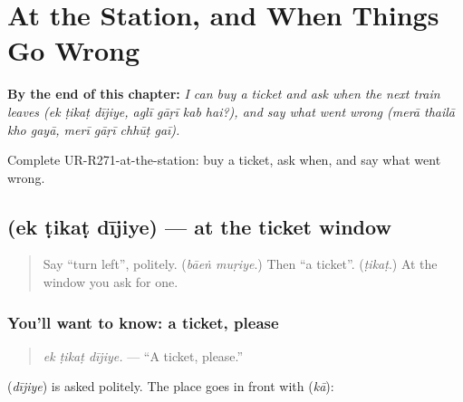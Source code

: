 
\chapter{At the Station, and When Things Go Wrong}
\label{ch:ur-at-the-station-and-when-things-go-wrong}

\begin{chapteropening}
\textbf{By the end of this chapter:} \emph{I can buy a ticket and ask when the next train leaves (ek ṭikaṭ dījiye, aglī gāṛī kab hai?), and say what went wrong (merā thailā kho gayā, merī gāṛī chhūṭ gaī).}

Complete UR-R271-at-the-station: buy a ticket, ask when, and say what went wrong.
\end{chapteropening}

\section[\texorpdfstring{\ur{ایک} \ur{ٹکٹ} \ur{دیجیے} (ek ṭikaṭ dījiye)}{ایک ٹکٹ دیجیے (ek ṭikaṭ dījiye)}]{   (ek ṭikaṭ dījiye) — at the ticket window}

\label{lesson:UR-C271-ek-tikat-dijiye}



\begin{quote}
Say \textquotedblleft{}turn left\textquotedblright{}, politely. (\emph{bāeṅ muṛiye}.) Then \textquotedblleft{}a ticket\textquotedblright{}. (\emph{ṭikaṭ}.) At the window you ask for one.
\end{quote}

\subsection*{You'll want to know: a ticket, please}
\begin{quote}
\textbf{  }
\end{quote}

\begin{quote}
\emph{ek ṭikaṭ dījiye.} — \textquotedblleft{}A ticket, please.\textquotedblright{}
\end{quote}

\textbf{} (\emph{dījiye}) is \textbf{} asked politely. The place goes in front with \textbf{} (\emph{kā}):

